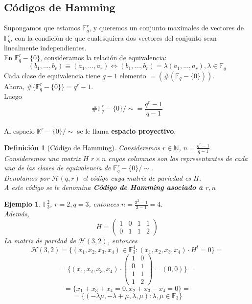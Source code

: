 \documentclass[spanish]{book}
\newtheorem{mydef}{Definición}
\newtheorem{ejem}{Ejemplo}
\begin{document}
\subsection{Códigos de Hamming}
Supongamos que estamos $\mathbb{F}_q^r$, y queremos un conjunto maximales de vectores de $\mathbb{F}_q^r$, con la condición de que cualesquiera dos vectores del conjunto sean linealmente independientes. \\
En $\mathbb{F}_q^r-\{0\}$, consideramos la relación de equivalencia:
$$(b_1, ..., b_r) \equiv (a_1, ..., a_r) \Longleftrightarrow (b_1, ..., b_r)= \lambda (a_1, ..., a_r), \lambda \in \mathbb{F}_q$$
Cada clase de equivalencia tiene $q-1$ elemento $=(\#(\mathbb{F}_q-\{0\}))$. \\
Ahora, $\#\{ \mathbb{F}_q^r - \{0\} \}=q^r-1$. \\
Luego $$\# \mathbb{F}_q^r-\{0\}/\sim = \frac{q^r-1}{q-1}$$ \\
Al espacio $\mathbb{K}^r-\{0\} / \sim$ se le llama \textbf{espacio proyectivo}. \\
\begin{mydef}[Código de Hamming]
	Consideremos $r \in \mathbb{N}$, $\displaystyle n=\frac{q^r-1}{q-1}$. Consideremos una matriz $H$ $r\times n$ cuyas columnas son los representantes de cada una de las clases de equivalencia de $\mathbb{F}_q^r-\{0\}/\sim$. \\
	Denotamos por $\mathcal{H}(q, r)$ el código cuya matriz de pariedad es $H$. \\
	A este código se le denomina \textbf{Código de Hamming asociado a $r,n$}
\end{mydef}

\begin{ejem}
	$\mathbb{F}_3^2$, $r=2, q=3$, entonces $\displaystyle n=\frac{3^2-1}{3-1}=4$. \\
	Además,
		$$H=
		\left(
		\begin{array}{cccc}
		1 & 0 & 1 & 1 \\
		0 & 1 & 1 & 2
		\end{array} \right)
		$$
	La matriz de paridad de $\mathcal{H}(3,2)$, entonces 
	$$\mathcal{H}(3, 2)=\{(x_1, x_2, x_3, x_4) \in \mathbb{F}_3^4 : (x_1, x_2, x_3, x_4) \cdot H^t=0 \}=$$
	$$= \{(x_1, x_2, x_3, x_4) \cdot \left(
	\begin{array}{cc}
	1 & 0 \\
	0 & 1 \\
	1 & 1 \\
	1 & 2
	\end{array} \right)=(0,0) \}=
	$$
	$$=\{x_1+x_3+x_4=0, x_2+x_3-x_4=0\}=$$
	$$=\{(-\lambda \mu, - \lambda + \mu, \lambda, \mu) : \lambda, \mu \in \mathbb{F}_3\}$$
\end{ejem}
\end{document}
